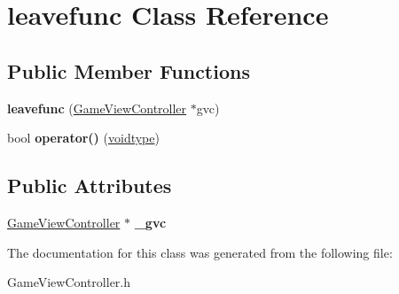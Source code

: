 \hypertarget{classleavefunc}{\section{leavefunc Class Reference}
\label{classleavefunc}
}
\subsection*{Public Member Functions}
\begin{DoxyCompactItemize}
\item 
\hypertarget{classleavefunc_a3945bc2bf6c7a6e20f63aa0d404539ef}{{\bfseries leavefunc} (\hyperlink{class_game_view_controller}{Game\-View\-Controller} $\ast$gvc)}\label{classleavefunc_a3945bc2bf6c7a6e20f63aa0d404539ef}

\item 
\hypertarget{classleavefunc_ad949ff1d0de1a12980191427bbde51e8}{bool {\bfseries operator()} (\hyperlink{structvoidtype}{voidtype})}\label{classleavefunc_ad949ff1d0de1a12980191427bbde51e8}

\end{DoxyCompactItemize}
\subsection*{Public Attributes}
\begin{DoxyCompactItemize}
\item 
\hypertarget{classleavefunc_a5c398672fa2a118d2c97af2296e20da6}{\hyperlink{class_game_view_controller}{Game\-View\-Controller} $\ast$ {\bfseries \-\_\-gvc}}\label{classleavefunc_a5c398672fa2a118d2c97af2296e20da6}

\end{DoxyCompactItemize}


The documentation for this class was generated from the following file\-:\begin{DoxyCompactItemize}
\item 
Game\-View\-Controller.\-h\end{DoxyCompactItemize}
